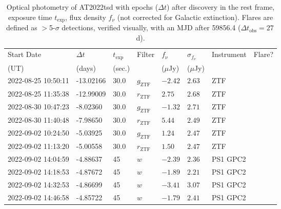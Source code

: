 \documentclass{nature_plusfigure}
\begin{document}
\begin{supplement}

\renewcommand{\thefigure}{Supplementary Information Figure~\arabic{figure}}
\renewcommand{\figurename}{}
\setcounter{figure}{0}
%


\renewcommand{\thetable}{Supplementary Information Table~\arabic{table}}
 \renewcommand{\tablename}{}
\setcounter{table}{0}

\begin{center} 
\begin{longtable}{llllllll} 
\caption{Optical photometry of AT2022tsd with epochs ($\Delta t$) after discovery in the rest frame, exposure time $t_\mathrm{exp}$, flux density $f_\nu$ (not corrected for Galactic extinction). Flares are defined as $>$5-$\sigma$ detections, verified visually, with an MJD after 59856.4 ($\Delta t_\mathrm{obs}=27\,$d).} 
\label{tab:optical-photometry}\\ 
\hline\hline
Start Date & $\Delta t$ & $t_\mathrm{exp}$ & Filter & $f_\nu$& $\sigma_{f_\nu}$ & Instrument & Flare?\\ 
(UT) & (days) & (sec.) &  & ($\mu$Jy) & ($\mu$Jy) &  & \\ 
\hline
2022-08-25 10:50:11 & -13.02166 & 30.0 & ${g}_\mathrm{ZTF}$ & $-2.42$ & $2.63$ & ZTF &  \\ 
2022-08-25 11:35:38 & -12.99009 & 30.0 & ${r}_\mathrm{ZTF}$ & $2.75$ & $2.68$ & ZTF &  \\ 
2022-08-30 10:47:23 & -8.02360 & 30.0 & ${g}_\mathrm{ZTF}$ & $-1.32$ & $2.71$ & ZTF &  \\ 
2022-08-30 11:40:48 & -7.98650 & 30.0 & ${r}_\mathrm{ZTF}$ & $5.44$ & $2.49$ & ZTF &  \\ 
2022-09-02 10:24:50 & -5.03925 & 30.0 & ${g}_\mathrm{ZTF}$ & $1.24$ & $2.47$ & ZTF &  \\ 
2022-09-02 11:13:20 & -5.00558 & 30.0 & ${r}_\mathrm{ZTF}$ & $1.50$ & $2.47$ & ZTF &  \\ 
2022-09-02 14:04:59 & -4.88637 & 45 & $w$ & $-2.39$ & $2.36$ & PS1 GPC2 &  \\ 
2022-09-02 14:18:53 & -4.87672 & 45 & $w$ & $-1.89$ & $2.21$ & PS1 GPC2 &  \\ 
2022-09-02 14:32:53 & -4.86699 & 45 & $w$ & $-3.41$ & $3.07$ & PS1 GPC2 &  \\ 
2022-09-02 14:46:58 & -4.85722 & 45 & $w$ & $-1.79$ & $2.41$ & PS1 GPC2 &  \\ 

\end{longtable}
\end{center}
\end{supplement}
\end{document}
